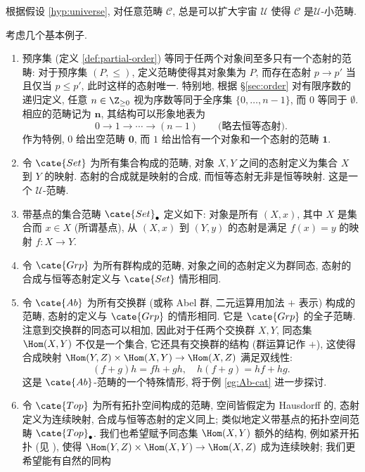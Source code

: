 根据假设 \ref{hyp:universe}, 对任意范畴 $\mathcal{C}$, 总是可以扩大宇宙 $\mathcal{U}$ 使得 $\mathcal{C}$ 是$\mathcal{U}$-小范畴.

\begin{example}\label{eg:categories}
	考虑几个基本例子.
	\begin{enumerate}
		\item 预序集 (定义 \ref{def:partial-order}) 等同于任两个对象间至多只有一个态射的范畴: 对于预序集 $(P, \leq)$, 定义范畴使得其对象集为 $P$, 而存在态射 $p \to p'$ 当且仅当 $p \leq p'$, 此时这样的态射唯一. 特别地, 根据 \S\ref{sec:order} 对有限序数的递归定义, 任意 $n \in \Z_{\geq 0}$ 视为序数等同于全序集 $\{0, \ldots, n-1\}$, 而 $0$ 等同于 $\emptyset$. 相应的范畴记为 $\mathbf{n}$, 其结构可以形象地表为
		\[ 0 \to 1 \to \cdots \to (n-1) \qquad \text{(略去恒等态射)}. \]
		作为特例, $0$ 给出空范畴 $\mathbf{0}$, 而 $1$ 给出恰有一个对象和一个态射的范畴 $\mathbf{1}$. 
		\item 令 $\cate{Set}$ 为所有集合构成的范畴, 对象 $X, Y$ 之间的态射定义为集合 $X$ 到 $Y$ 的映射. 态射的合成就是映射的合成, 而恒等态射无非是恒等映射. 这是一个 $\mathcal{U}$-范畴.
		\item 带基点的集合范畴 $\cate{Set}_\bullet$ 定义如下: 对象是所有 $(X, x)$, 其中 $X$ 是集合而 $x \in X$ (所谓基点), 从 $(X,x)$ 到 $(Y,y)$ 的态射是满足 $f(x)=y$ 的映射 $f: X \to Y$. 
		\item 令 $\cate{Grp}$ 为所有群构成的范畴, 对象之间的态射定义为群同态, 态射的合成与恒等态射定义与 $\cate{Set}$ 情形相同.
		\item 令 $\cate{Ab}$ 为所有交换群 (或称 Abel 群, 二元运算用加法 $+$ 表示) 构成的范畴, 态射的定义与 $\cate{Grp}$ 的情形相同. 它是 $\cate{Grp}$ 的全子范畴. 注意到交换群的同态可以相加, 因此对于任两个交换群 $X, Y$, 同态集 $\Hom(X, Y)$ 不仅是一个集合, 它还具有交换群的结构 (群运算记作 $+$), 这使得合成映射 $\Hom(Y, Z) \times \Hom(X, Y) \to \Hom(X, Z)$ 满足双线性:
		\[ (f + g) h = fh + gh, \quad h(f+g) = hf + hg. \]
		这是 $\cate{Ab}$-范畴的一个特殊情形, 将于例 \ref{eg:Ab-cat} 进一步探讨.
		\item 令 $\cate{Top}$ 为所有拓扑空间构成的范畴, 空间皆假定为 Hausdorff 的, 态射定义为连续映射, 合成与恒等态射的定义同上; 类似地定义带基点的拓扑空间范畴 $\cate{Top}_\bullet$. 我们也希望赋予同态集 $\Hom(X,Y)$ 额外的结构, 例如紧开拓扑 (见 \cite[\S 9.3]{Xiong}), 使得 $\Hom(Y, Z) \times \Hom(X, Y) \to \Hom(X, Z)$ 成为连续映射; 我们更希望能有自然的同构 

\end{enumerate}
\end{example}
